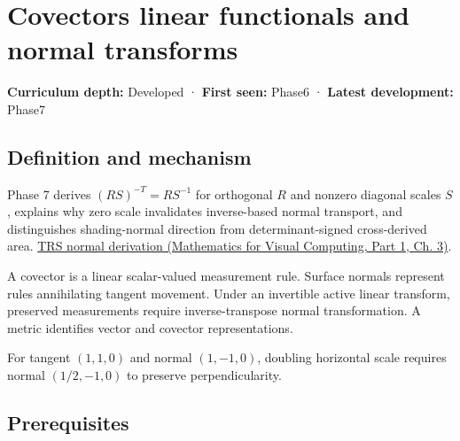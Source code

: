 \hypertarget{appendix-46da295c6787}{}\label{referencestart:appendix-46da295c6787}
\section{Covectors linear functionals and normal transforms}\label{appendix-46da295c6787-covectors-linear-functionals-and-normal-transforms}

\hypertarget{appendix-46da295c6787-covectors-linear-functionals-and-normal-transforms}{}

\textbf{Curriculum depth:} Developed · \textbf{First seen:} Phase6 · \textbf{Latest development:} Phase7

\begin{allmightroledefinition}

\subsection{Definition and mechanism}\label{appendix-46da295c6787-definition-and-mechanism}

\hypertarget{appendix-46da295c6787-definition-and-mechanism}{}

Phase 7 derives \((RS)^{-T}=RS^{-1}\) for orthogonal \(R\) and nonzero diagonal scales \(S\), explains why zero scale invalidates inverse-based normal transport, and distinguishes shading-normal direction from determinant-signed cross-derived area. \href{../02-Mathematics-for-Visual-Computing-P01/main.pdf\#01-foundations-i-ch019-normals-undo-scale-before-following-rotation}{TRS normal derivation (Mathematics for Visual Computing, Part 1, Ch. 3)}.

\end{allmightroledefinition}

A covector is a linear scalar-valued measurement rule. Surface normals represent rules annihilating tangent movement. Under an invertible active linear transform, preserved measurements require inverse-transpose normal transformation. A metric identifies vector and covector representations.

For tangent \((1,1,0)\) and normal \((1,-1,0)\), doubling horizontal scale requires normal \((1/2,-1,0)\) to preserve perpendicularity.

\subsection{Prerequisites}\label{appendix-46da295c6787-prerequisites}

\hypertarget{appendix-46da295c6787-prerequisites}{}

